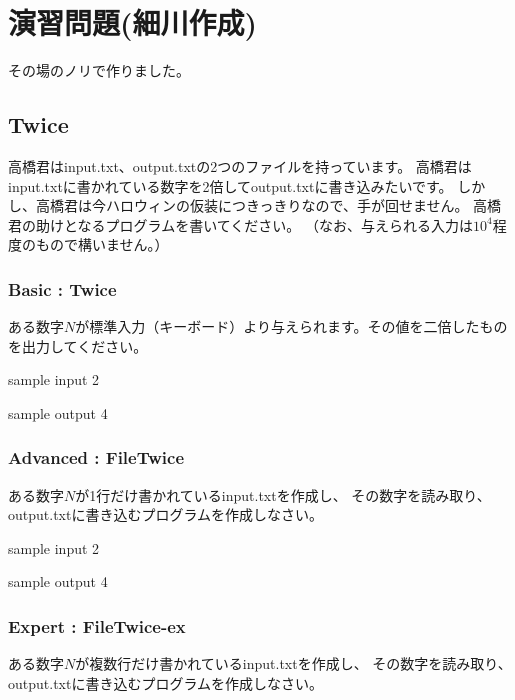 \section{演習問題(細川作成)}
	
	その場のノリで作りました。
	
	\subsection{Twice}
		高橋君はinput.txt、output.txtの2つのファイルを持っています。
		高橋君はinput.txtに書かれている数字を2倍してoutput.txtに書き込みたいです。
		しかし、高橋君は今ハロウィンの仮装につきっきりなので、手が回せません。
		高橋君の助けとなるプログラムを書いてください。
		（なお、与えられる入力は$10^4$程度のもので構いません。）

	\subsubsection{Basic : Twice}
		ある数字$N$が標準入力（キーボード）より与えられます。その値を二倍したものを出力してください。
		
		\begin{itembox}{sample input}
			2
		\end{itembox}
		
		\begin{itembox}{sample output}
			4
		\end{itembox}

	\subsubsection{Advanced : FileTwice}
		ある数字$N$が1行だけ書かれているinput.txtを作成し、
		その数字を読み取り、output.txtに書き込むプログラムを作成しなさい。
		
		\begin{itembox}{sample input}
			2
		\end{itembox}
		
		\begin{itembox}{sample output}
			4
		\end{itembox}
		
	\subsubsection{Expert : FileTwice-ex}
		ある数字$N$が複数行だけ書かれているinput.txtを作成し、
		その数字を読み取り、output.txtに書き込むプログラムを作成しなさい。
		
